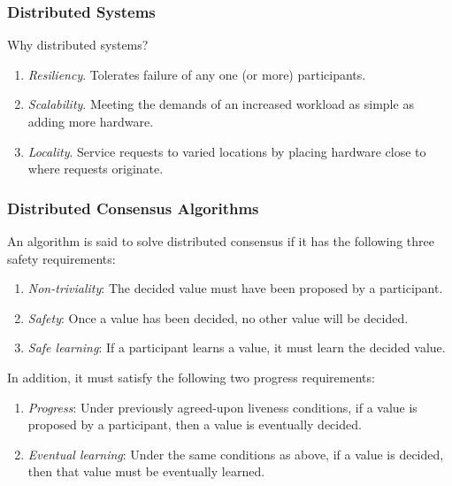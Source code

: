 \documentclass[aspectratio=169,compress,handout]{beamer}
\begin{document}
  \begin{frame}
    \frametitle{Distributed Systems}
    Why distributed systems?
    \begin{enumerate}[<+->]
      \item \emph{Resiliency}. Tolerates failure of any one (or more)
        participants.
      \item \emph{Scalability}. Meeting the demands of an increased workload as
        simple as adding more hardware.
      \item \emph{Locality}. Service requests to varied locations by placing
        hardware close to where requests originate.
    \end{enumerate}
  \end{frame}

  \begin{frame}
    \frametitle{Distributed Consensus Algorithms}
    \begin{definition}
      An algorithm is said to solve distributed consensus if it has the following
      three safety requirements:
      \begin{enumerate}
        \item<2-> \emph{Non-triviality}: The decided value must have been proposed by a
          participant.
        \item<3-> \emph{Safety}: Once a value has been decided, no other value will be
          decided.
        \item<4-> \emph{Safe learning}: If a participant learns a value, it must learn
          the decided value.
      \end{enumerate}
      In addition, it must satisfy the following two progress requirements:
      \begin{enumerate}
        \item<5-> \emph{Progress}: Under previously agreed-upon liveness conditions, if
          a value is proposed by a participant, then a value is eventually decided.
        \item<6-> \emph{Eventual learning}: Under the same conditions as above, if a
          value is decided, then that value must be eventually learned.
      \end{enumerate}
    \end{definition}
  \end{frame}
\end{document}

